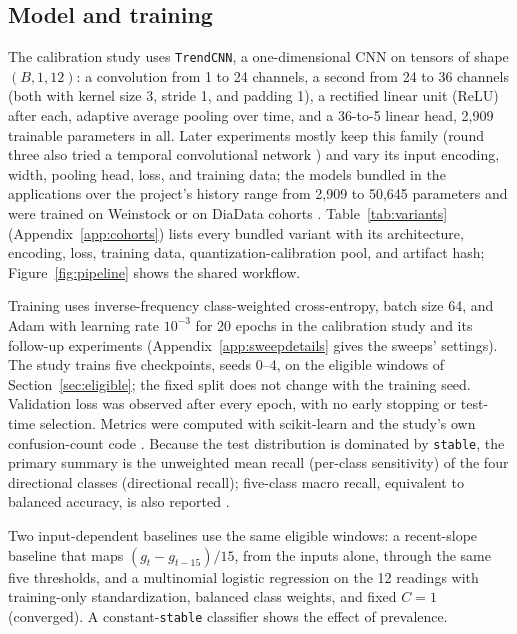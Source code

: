 \documentclass[10pt,twocolumn]{article}
\begin{document}
\subsection{Model and training}

The calibration study uses \texttt{TrendCNN}, a one-dimensional CNN on
tensors of shape $(B,1,12)$: a convolution from 1 to 24 channels, a second
from 24 to 36 channels (both with kernel size 3, stride 1, and padding 1),
a rectified linear unit (ReLU) after each, adaptive average pooling over
time, and a 36-to-5 linear head, 2,909 trainable parameters in all. Later
experiments mostly keep this family (round three also tried a temporal
convolutional network \cite{bai2018tcn}) and vary its input encoding, width, pooling head,
loss, and training data; the models bundled in the applications over
the project's history range from 2,909 to 50,645 parameters and were
trained on Weinstock or on DiaData cohorts \cite{cinar2026diadata}.
Table~\ref{tab:variants} (Appendix~\ref{app:cohorts}) lists every bundled
variant with its architecture,
encoding, loss, training data, quantization-calibration pool, and artifact
hash; Figure~\ref{fig:pipeline} shows the shared workflow.

Training uses inverse-frequency class-weighted cross-entropy, batch size
64, and Adam with learning rate $10^{-3}$ for 20 epochs
\cite{kingma2015adam,paszke2019pytorch} in the calibration study and its
follow-up experiments (Appendix~\ref{app:sweepdetails} gives the sweeps'
settings). The study trains five checkpoints, seeds 0--4, on the eligible
windows of Section~\ref{sec:eligible}; the fixed split does not change with
the training seed. Validation loss was observed after every epoch, with no
early stopping or test-time selection. Metrics were computed with
scikit-learn and the study's own confusion-count code
\cite{pedregosa2011scikit}. Because the test distribution is dominated by
\texttt{stable}, the primary summary is the unweighted mean recall
(per-class sensitivity) of the four directional classes (directional
recall); five-class macro recall, equivalent to balanced accuracy, is also
reported \cite{brodersen2010balanced}.

Two input-dependent baselines use the same eligible windows: a recent-slope
baseline that maps $(g_t - g_{t-15})/15$, from the inputs alone, through
the same five thresholds, and a multinomial logistic regression on the 12
readings with training-only standardization, balanced class weights, and
fixed $C=1$ (converged). A constant-\texttt{stable} classifier shows the
effect of prevalence.
\end{document}
